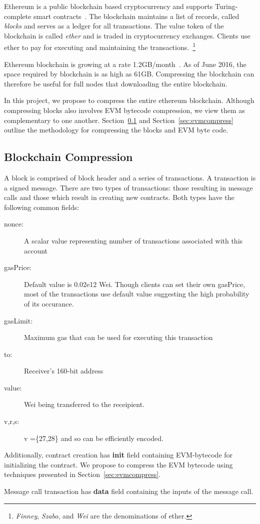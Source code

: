 
Ethereum is a public blockchain based cryptocurrency and supports Turing-complete smart contracts~\cite{ethereum}.
The blockchain maintains a list of records, called \emph{blocks} and serves as a ledger for all transactions.
The value token of the blockchain is called \emph{ether} and 
is traded in cryptocurrency exchanges.
Clients use ether to pay for executing and maintaining the transactions.~\footnote{
\emph{Finney}, \emph{Szabo}, and \emph{Wei} are the denominations of ether.}
 
Ethereum blockchain is growing at a rate 1.2GB/month~\cite{ethdiskspace}.
As of June 2016, the space required by blockchain is as high as 61GB.
Compressing the blockchain can therefore be useful for full nodes that downloading the entire blockchain.

In this project, we propose to compress the entire ethereum blockchain. 
Although compressing blocks also involves EVM bytecode compression, 
we view them as complementary to one another.
Section~\ref{sec:blockcompress} and 
Section~\ref{sec:evmcompress}  
outline the methodology for compressing the blocks and EVM byte code.

\subsection{Blockchain Compression}\label{sec:blockcompress}

A block is comprised of block header and a series of transactions. A transaction is a signed message.
There are two types of transactions: those resulting in message calls and those which result in creating new contracts.
Both types have the following common fields:
\begin{description}
  \item[nonce:] A scalar value representing number of transactions associated with this account
  \item[gasPrice:] Default value is 0.02e12 Wei. Though clients can set their own gasPrice, most of the transactions use default value suggesting the high probability of its occurance.
  \item[gasLimit:] Maximum gas that can be used for executing this transaction
  \item[to:] Receiver's 160-bit address
  \item[value:] Wei being transferred to the receipient.
  \item[v,r,s:] v =\{27,28\} and so can be efficiently encoded.
\end{description}

Additionally, contract creation has \textbf{init} field containing EVM-bytecode for initializing the contract.
We propose to compress the EVM bytecode using techniques presented in Section~\ref{sec:evmcompress}. 

Message call transaction has \textbf{data} field containing the inputs of the message call.

%

